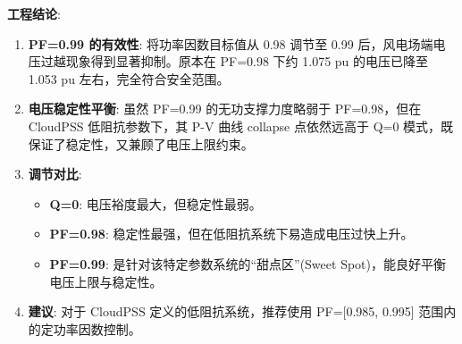 \documentclass[11pt,a4paper]{ctexart}
\begin{document}
\textbf{工程结论}:
\begin{enumerate}
    \item \textbf{PF=0.99 的有效性}: 将功率因数目标值从 0.98 调节至 0.99 后，风电场端电压过越现象得到显著抑制。原本在 PF=0.98 下约 1.075 pu 的电压已降至 1.053 pu 左右，完全符合安全范围。
    \item \textbf{电压稳定性平衡}: 虽然 PF=0.99 的无功支撑力度略弱于 PF=0.98，但在 CloudPSS 低阻抗参数下，其 P-V 曲线 collapse 点依然远高于 Q=0 模式，既保证了稳定性，又兼顾了电压上限约束。
    \item \textbf{调节对比}: 
    \begin{itemize}
        \item \textbf{Q=0}: 电压裕度最大，但稳定性最弱。
        \item \textbf{PF=0.98}: 稳定性最强，但在低阻抗系统下易造成电压过快上升。
        \item \textbf{PF=0.99}: 是针对该特定参数系统的“甜点区”(Sweet Spot)，能良好平衡电压上限与稳定性。
    \end{itemize}
    \item \textbf{建议}: 对于 CloudPSS 定义的低阻抗系统，推荐使用 PF=[0.985, 0.995] 范围内的定功率因数控制。
\end{enumerate}
\end{document}
